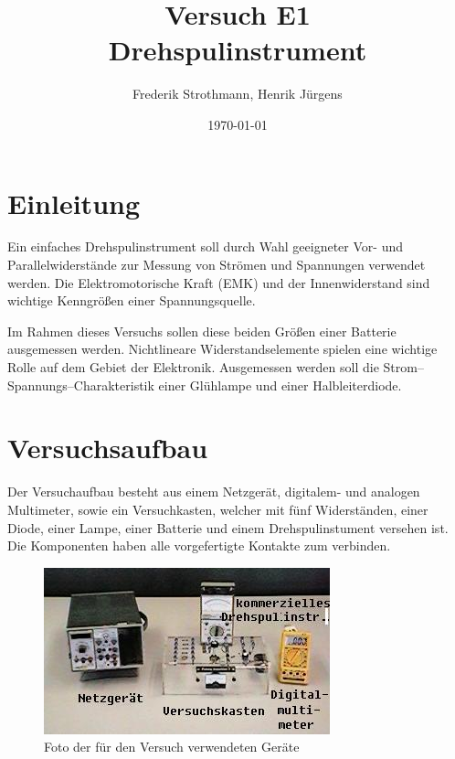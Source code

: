\documentclass[12pt]{scrartcl}
\title{Versuch E1\\ Drehspulinstrument}
\author{Frederik Strothmann, Henrik Jürgens}
\date{\today}
\begin{document}

\maketitle
\tableofcontents
\newpage



\section{Einleitung}

Ein einfaches Drehspulinstrument soll durch Wahl geeigneter Vor- und Parallelwiderstände
zur Messung von Strömen und Spannungen verwendet werden.
Die Elektromotorische Kraft (EMK) und der Innenwiderstand sind wichtige Kenngrößen einer Spannungsquelle.

Im Rahmen dieses Versuchs sollen diese beiden Größen einer Batterie ausgemessen werden.
Nichtlineare Widerstandselemente spielen eine wichtige Rolle auf dem Gebiet der Elektronik. Ausgemessen werden soll die Strom–Spannungs–Charakteristik einer Glühlampe
und einer Halbleiterdiode.

\section{Versuchsaufbau}
Der Versuchaufbau besteht aus einem Netzgerät, digitalem- und analogen Multimeter, sowie ein Versuchkasten, welcher mit fünf Widerständen, einer Diode, einer Lampe, einer Batterie und einem Drehspulinstument versehen ist. Die Komponenten haben alle vorgefertigte Kontakte zum verbinden.


\begin{figure}[htbp] 
  \centering
    \includegraphics[scale = 0.5]{versuchsaufbau.JPG}
  	\caption[Foto der für den Versuch verwendeten Geräte]{Foto der für den Versuch verwendeten Geräte\footnotemark}
  \label{fig:versuchsaufbau}
\end{figure}
\end{document}
